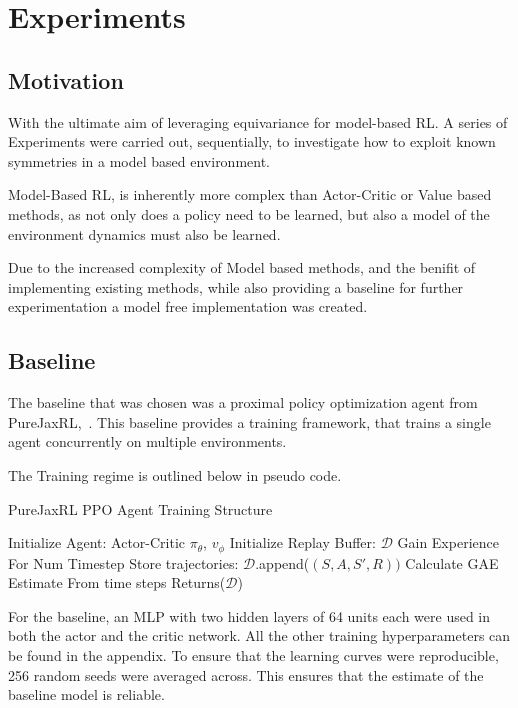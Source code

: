 \chapter{Experiments}
\section{Motivation}
With the ultimate aim of leveraging equivariance for model-based RL. A series of Experiments were carried out, sequentially, to investigate how to exploit known symmetries in a model based environment.

Model-Based RL, is inherently more complex than Actor-Critic or Value based methods, as not only does a policy need to be learned, but also a model of the environment dynamics must also be learned.

Due to the increased complexity of Model based methods, and the benifit of implementing existing methods, while also providing a baseline for further experimentation a model free implementation was created.

\section{Baseline}
The baseline that was chosen was a proximal policy optimization agent from PureJaxRL,~\cite{lu2022discovered}. This baseline provides a training framework, that trains a single agent concurrently on multiple environments.

The Training regime is outlined below in pseudo code.
\begin{algorithm}
	\caption{PureJaxRL PPO Agent Training Structure}
	\begin{algorithmic}
		\State Initialize Agent: Actor-Critic $\pi_\theta$, $v_\phi$
		\State Initialize Replay Buffer: $\mathcal{D}$
		\State Gain Experience For Num Timestep
		\State Store trajectories: $\mathcal{D}$.append($(S, A, S', R))$
		\State Calculate GAE Estimate From time steps
		\EndFor
		\EndFor
		\State Returns($\mathcal{D}$)

	\end{algorithmic}
\end{algorithm}

For the baseline, an MLP with two hidden layers of 64 units each were used in both the actor and the critic network. All the other training hyperparameters can be found in the appendix. To ensure that the learning curves were reproducible, 256 random seeds were averaged across. This ensures that the estimate of the baseline model is reliable.


